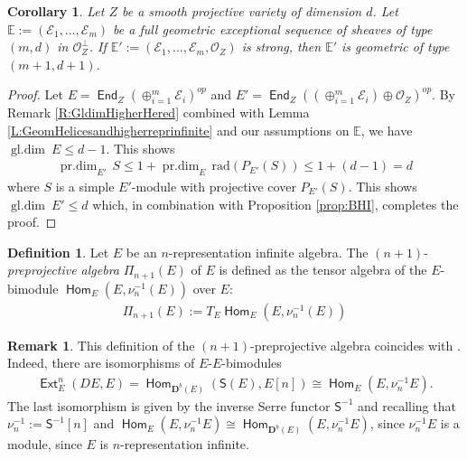 \documentclass[a4paper,11pt, reqno]{amsart}
\def\E{\mathbb E}
\def\DD{\mathbf D}
\def\sE{\mathscr{E}}
\def\gldim{{\operatorname{gl.dim}\ }}
\def\projdim{{\operatorname{pr.dim}}}
\newcommand{\opname}[1]{\operatorname{\mathsf{#1}}}
\newcommand{\Hom}{\opname{Hom}}
\newcommand{\End}{\opname{End}}
\newcommand{\Ext}{\opname{Ext}}
\newcommand{\op}{^{op}}
\def\Db{\DD^b}
\newcommand{\bS}{\mathsf{S}}
\theoremstyle{plain}
\newtheorem{corollary}[dummy]{Corollary}
\theoremstyle{definition}
\newtheorem{definition}[dummy]{Definition}
\newtheorem{remark}[dummy]{Remark}
\numberwithin{equation}{section}
\begin{document}
\begin{corollary}\label{cor:geometric-subcollection}
    Let $Z$ be a smooth projective variety of dimension $d$. Let $\E:=(\sE_1, \ldots, \sE_m)$ be a full geometric exceptional sequence of \emph{sheaves} of type $(m,d)$ in $\mathcal{O}_Z^\perp$.
    If $\E':=(\sE_1, \ldots, \sE_m, \mathcal{O}_Z)$ is strong, then $\E'$ is geometric of type $(m+1,d+1)$. 
\end{corollary}
\begin{proof}
    Let $E=\End_Z(\oplus_{i=1}^m \sE_i)\op$ and $E'=\End_Z((\oplus_{i=1}^m \sE_i) \oplus \mathcal{O}_Z)\op$. By Remark \ref{R:GldimHigherHered} combined with Lemma \ref{L:GeomHelicesandhigherreprinfinite} and our assumptions on $\E$, we have $\gldim E \leq d-1$.  This shows \begin{align}
      \projdim_{E'}\, S \leq 1 + \projdim_E\, \mathrm{rad}(P_{E'}(S)) \leq 1+(d-1)=d  
    \end{align}
    where $S$ is a simple $E'$-module with projective cover $P_{E'}(S)$. This shows $\gldim E' \leq d$ which, in combination with Proposition \ref{prop:BHI}, completes the proof.
\end{proof}




\begin{definition}\label{D:HigherpreprojAlg} 
    Let $E$ be an $n$-representation infinite algebra. The $(n+1)$-\emph{preprojective algebra} $\Pi_{n+1}(E)$ of $E$ is defined as the tensor algebra of the $E$-bimodule $\Hom_E(E, \nu_n^{-1}(E)) $ over $E$:
    \begin{align}
      \Pi_{n+1}(E):=T_E \Hom_E(E, \nu_n^{-1}(E))   
    \end{align}
\end{definition}

\begin{remark}\label{R:careful}
This definition of the $(n+1)$-preprojective algebra coincides with \cite[Definition 2.11]{IyamaOppermann}. Indeed,
 there are isomorphisms of $E$-$E$-bimodules 
 \begin{align}
  \Ext^n_E(DE, E) = \Hom_{\Db(E)}(\bS(E), E[n]) \cong  \Hom_E(E,\nu_n^{-1}E).
  \end{align}
  The last isomorphism is given by the inverse Serre functor $\bS^{-1}$ and recalling that $\nu_n^{-1}:=\bS^{-1}[n]$ and
  $\Hom_E(E,\nu_n^{-1}E) \cong \Hom_{\Db(E)}(E,\nu_n^{-1}E)$, since $\nu_n^{-1}E$ is a module, since $E$ is $n$-representation infinite.
\end{remark}
\end{document}
